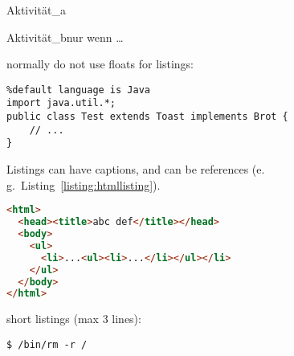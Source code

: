 \lipsum[17]

\begin{activity}{Aktivität\_a}{}
    \lipsum[18-19]
\end{activity}

\begin{activity}{Aktivität\_b}{nur wenn \dots}
    \lipsum[20]
\end{activity}

normally do not use floats for listings:
\begin{lstlisting}%default language is Java
import java.util.*;
public class Test extends Toast implements Brot {
    // ...
}
\end{lstlisting}

Listings can have captions, and can be references (e.\,g.~Listing~\ref{listing:htmllisting}).
\begin{lstlisting}[language=HTML, caption={sourcecode in different languages possible, can have a caption}, label=listing:htmllisting]
<html>
  <head><title>abc def</title></head>
  <body>
    <ul>
      <li>...<ul><li>...</li></ul></li>
    </ul>
  </body>
</html>
\end{lstlisting}

short listings (max 3 lines):
\begin{lstlisting}[style=nonumbers]
$ /bin/rm -r /
\end{lstlisting}
